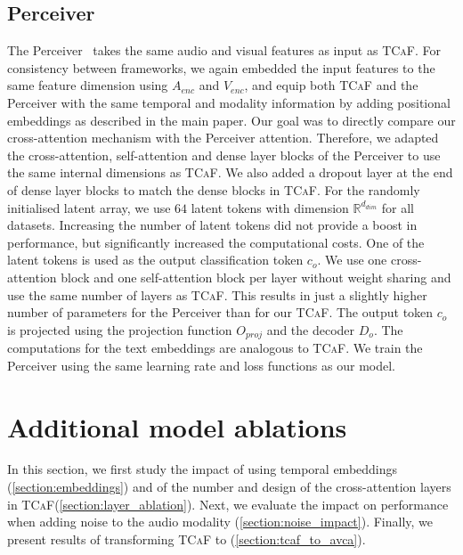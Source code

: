 \documentclass[runningheads]{llncs}
\newcommand{\modelName}{\textsc{TCaF}\xspace}
\begin{document}
\subsection{Perceiver}
The Perceiver~\cite{jaegle2021perceiver} takes the same audio and visual features as input as \modelName. For consistency between frameworks, we again embedded the input features to the same feature dimension using $A_{enc}$ and $V_{enc}$, and equip both \modelName and the Perceiver with the same temporal and modality information by adding positional embeddings as described in the main paper. Our goal was to directly compare our cross-attention mechanism with the Perceiver attention.
Therefore, we adapted the cross-attention, self-attention and dense layer blocks of the Perceiver to use the same internal dimensions as \modelName. We also added a dropout layer at the end of dense layer blocks to match the dense blocks in \modelName. For the randomly initialised latent array, we use $64$ latent tokens with dimension $\mathbb{R}^{d_{dim}}$ for all datasets. Increasing the number of latent tokens did not provide a boost in performance, but significantly increased the computational costs. One of the latent tokens is used as the output classification token $c_o$. We use one cross-attention block and one self-attention block per layer without weight sharing and use the same number of layers as \modelName. This results in just a slightly higher number of parameters for the Perceiver than for our \modelName. The output token $c_o$ is  projected using the projection function $O_{proj}$ and the decoder $D_o$. The computations for the text embeddings are analogous to \modelName. We train the Perceiver using the same learning rate and loss functions as our model. 


\section{Additional model ablations}\label{section:supp_ablations}

In this section, we first study the impact of using temporal embeddings (\cref{section:embeddings}) and of the number and design of the cross-attention layers in \modelName (\cref{section:layer_ablation}).
Next, we evaluate the impact on performance when adding noise to the audio modality (\cref{section:noise_impact}).
Finally, we present results of transforming \modelName to \cite{mercea2022} (\cref{section:tcaf_to_avca}). 
\end{document}
